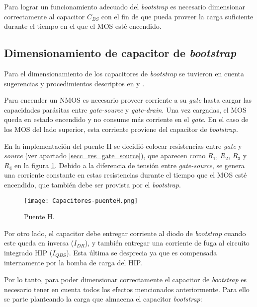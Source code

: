 \noindent Para lograr un funcionamiento adecuado del \textsl{bootstrap} es necesario dimensionar correctamente al capacitor $C_{BS}$ con el fin de que pueda proveer la carga suficiente durante el tiempo en el que el MOS esté encendido.


\subsection{Dimensionamiento de capacitor de \textsl{bootstrap}}

\noindent Para el dimensionamiento de los capacitores de \textsl{bootstrap} se tuvieron en cuenta sugerencias y procedimientos descriptos en \cite{HIP4081A_AN9405} y \cite{HIP4081A_FN3659}.

\noindent Para encender un NMOS es necesario proveer corriente a su \textsl{gate} hasta cargar las capacidades parásitas entre \textsl{gate-source} y \textsl{gate-drain}. Una vez cargadas, el MOS queda en estado encendido y no consume más corriente en el \textsl{gate}. En el caso de los MOS del lado superior, esta corriente proviene del capacitor de \textsl{bootstrap}. 

\noindent En la implementación del puente H se decidió colocar resistencias entre \textsl{gate} y \textsl{source} (ver apartado \ref{secc_res_gate_source}), que aparecen como $R_1$, $R_2$, $R_3$ y $R_4$ en la figura \ref{fig:img_capacitores-puenteH}. Debido a la diferencia de tensión entre \textsl{gate-source}, se genera una corriente constante en estas resistencias durante el tiempo que el MOS esté encendido, que también debe ser provista por el  \textsl{bootstrap}.

\begin{figure}[H]
	\centering
	\texttt{[image: Capacitores-puenteH.png]}
	\caption{Puente H.}
	\label{fig:img_capacitores-puenteH}
\end{figure}

\noindent Por otro lado, el capacitor debe entregar corriente al diodo de \textsl{bootstrap} cuando este queda en inversa ($I_{DR}$), y también entregar una corriente de fuga al circuito integrado HIP ($I_{QBS}$). Esta última se desprecia ya que es compensada internamente por la bomba de carga del HIP.

\noindent Por lo tanto, para poder dimensionar correctamente el capacitor de \textsl{bootstrap} es necesario tener en cuenta todos los efectos mencionados anteriormente. Para ello se parte planteando la carga que almacena el capacitor \textsl{bootstrap}:

